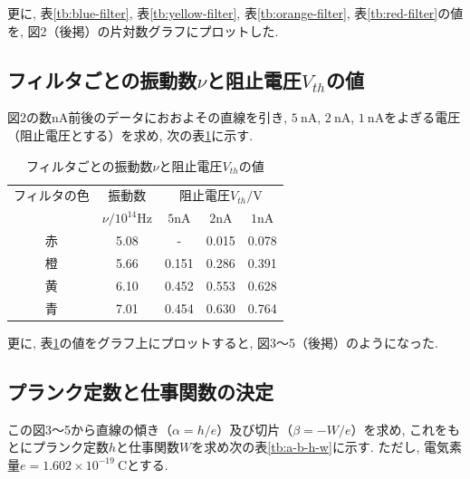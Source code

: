 \documentclass{jarticle}
\begin{document}
更に, 表\ref{tb:blue-filter}, 表\ref{tb:yellow-filter}, 表\ref{tb:orange-filter}, 表\ref{tb:red-filter}の値を, 図2（後掲）の片対数グラフにプロットした.



\subsection{フィルタごとの振動数$\nu$と阻止電圧$V_{th}$の値}

図2の数$\mathrm{nA}$前後のデータにおおよその直線を引き, $5\ \mathrm{nA}$, $2\ \mathrm{nA}$, $1\ \mathrm{nA}$をよぎる電圧（阻止電圧とする）を求め, 次の表\ref{tb:blocking-voltage}に示す.

\begin{table}[H]
  \centering
  \caption{フィルタごとの振動数$\nu$と阻止電圧$V_{th}$の値}
  \label{tb:blocking-voltage}
  \begin{tabular}{ccccc}
    \hline
    フィルタの色 & 振動数 & \multicolumn{3}{c}{阻止電圧$V_{th}/\mathrm{V}$} \\
    & $\nu/10^{14}\mathrm{Hz}$ & $5\mathrm{nA}$ & $2\mathrm{nA}$ & $1\mathrm{nA}$ \\
    \hline
    赤 & 5.08 & - & 0.015 & 0.078 \\
    橙 & 5.66 & 0.151 & 0.286 & 0.391 \\
    黄 & 6.10 & 0.452 & 0.553 & 0.628 \\
    青 & 7.01 & 0.454 & 0.630 & 0.764 \\
    \hline
  \end{tabular}
\end{table}

更に, 表\ref{tb:blocking-voltage}の値をグラフ上にプロットすると, 図3～5（後掲）のようになった.



\subsection{プランク定数と仕事関数の決定}

この図3～5から直線の傾き（$\alpha = h / e$）及び切片（$\beta = -W / e$）を求め, これをもとにプランク定数$h$と仕事関数$W$を求め次の表\ref{tb:a-b-h-w}に示す.
ただし, 電気素量$e = 1.602\times 10^{-19}\ \mathrm{C}$\cite{SI}とする.
\end{document}
